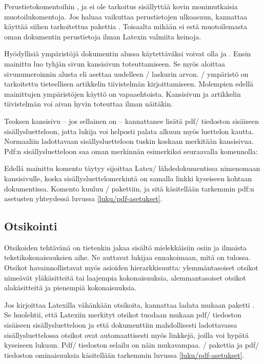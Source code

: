 Perustietokomentoihin ,  ja
 ei ole tarkoitus sisällyttää kovin monimutkaisia
muotoilukomentoja. Jos haluaa vaikuttaa perustietojen ulkoasuun,
kannattaa käyttää siihen tarkoitettua pakettia .
Toisaalta mikään ei estä muotoilemasta oman dokumentin perustietoja
ilman Latexin valmiita keinoja.

Hyödyllisiä ympäristöjä dokumentin alussa käytettäväksi voivat olla
 ja . Ensin mainittu luo
tyhjän sivun kansisivun toteuttamiseen. Se myös aloittaa sivunumeroinnin
alusta eli asettaa uudelleen \-/ laskurin arvon.
\-/ ympäristö on tarkoitettu tieteellisen artikkelin
tiivistelmän kirjoittamiseen. Molempien edellä mainittujen ympäristöjen
käyttö on vapaaehtoista. Kansisivun ja artikkelin tiivistelmän voi aivan
hyvin toteuttaa ilman näitäkin.

Teoksen kansisivu -- jos sellainen on -- kannattanee lisätä pdf\-/
tiedoston sisäiseen sisällysluetteloon, jotta lukija voi helposti palata
alkuun myös luettelon kautta. Normaaliin ladottavaan sisällysluetteloon
tuskin koskaan merkitään kansisivua. Pdf:n sisällysluetteloon saa oman
merkinnän esimerkiksi seuraavalla komennolla:

\begin{koodilohkosis}
\end{koodilohkosis}

\noindent
Edellä mainittu komento  täytyy sijoittaa Latex\-/
lähdedokumentissa nimenomaan kansisivulle, koska
sisällysluettelomerkintä on samalla linkki kyseiseen kohtaan
dokumentissa. Komento kuuluu \-/ pakettiin, ja sitä
käsitellään tarkemmin pdf:n asetusten yhteydessä luvussa
\ref{luku/pdf-asetukset}.

\subsection{Otsikointi}
\label{luku/otsikot}

Otsikoiden tehtävänä on tietenkin jakaa sisältö mielekkäisiin osiin ja
ilmaista tekstikokonaisuuksien aihe. Ne auttavat lukijaa ennakoimaan,
mitä on tulossa. Otsikot havainnollistavat myös asioiden
hierarkkisuutta: ylemmäntasoiset otsikot nimeävät yläkäsitteitä tai
laajempia kokonaisuuksia, alemmantasoiset otsikot alakäsitteitä ja
pienempiä kokonaisuuksia.

Jos kirjoittaa Latexilla vähänkään otsikoita, kannattaa ladata mukaan
paketti . Se huolehtii, että Latexiin merkityt otsikot
tuodaan mukaan pdf\-/ tiedoston sisäiseen sisällysluetteloon ja että
dokumenttiin mahdollisesti ladottavassa sisällysluettelossa otsikot ovat
automaattisesti myös linkkejä, joilla voi hypätä kyseiseen lukuun.
Pdf\-/ tiedoston selailu on näin mukavampaa. \-/
pakettia ja pdf\-/ tiedoston ominaisuuksia käsitellään tarkemmin luvussa
\ref{luku/pdf-asetukset}.

